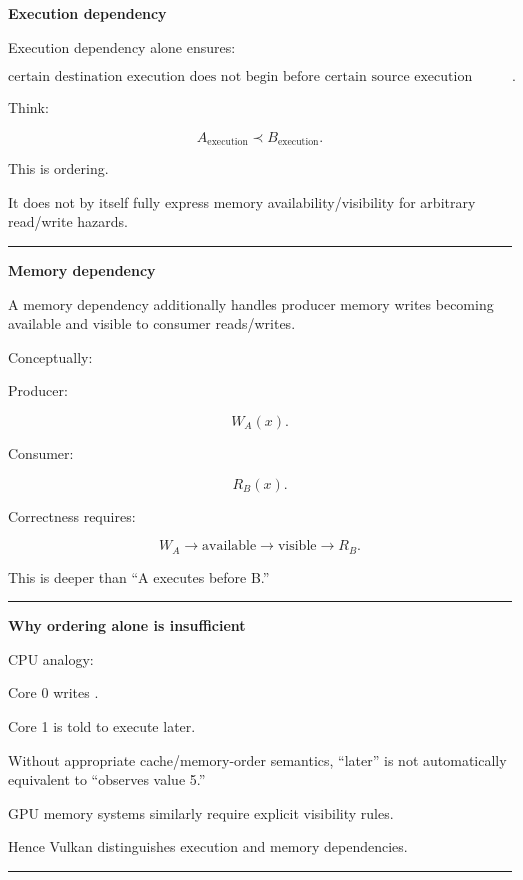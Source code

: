 \textbf{Execution dependency}

Execution dependency alone ensures:

\[
\boxed{
\text{certain destination execution does not begin before certain source execution reaches the required point}.
}
\]

Think:

\[
A_{\text{execution}}
\prec
B_{\text{execution}}.
\]

This is ordering.

It does not by itself fully express memory availability/visibility for arbitrary read/write hazards.

\begin{center}\rule{0.5\linewidth}{0.5pt}\end{center}

\textbf{Memory dependency}

A memory dependency additionally handles producer memory writes becoming available and visible to consumer reads/writes.

Conceptually:

Producer:

\[
W_A(x).
\]

Consumer:

\[
R_B(x).
\]

Correctness requires:

\[
\boxed{
W_A
\rightarrow
\text{available}
\rightarrow
\text{visible}
\rightarrow
R_B.
}
\]

This is deeper than ``A executes before B.''

\begin{center}\rule{0.5\linewidth}{0.5pt}\end{center}

\textbf{Why ordering alone is insufficient}

CPU analogy:

Core 0 writes .

Core 1 is told to execute later.

Without appropriate cache/memory-order semantics, ``later'' is not automatically equivalent to ``observes value 5.''

GPU memory systems similarly require explicit visibility rules.

Hence Vulkan distinguishes execution and memory dependencies.

\begin{center}\rule{0.5\linewidth}{0.5pt}\end{center}

